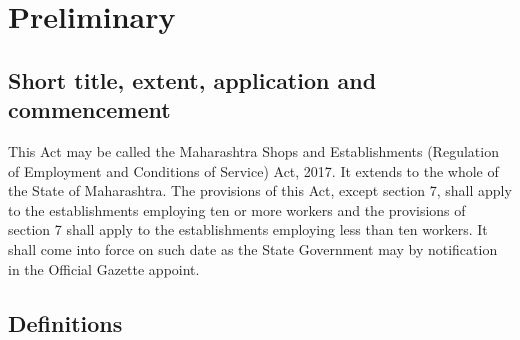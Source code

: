 \documentclass[gaz8,ordinance]{mhact}
\begin{document}
    



        \chapter{Preliminary} 
        
        \section{Short title, extent, application and commencement} 
        
      \begin{subsectionlist}
    
     This Act may be called the Maharashtra Shops and Establishments (Regulation of Employment and Conditions of Service) Act, 2017.
     It extends to the whole of the State of Maharashtra.
     The provisions of this Act, except section 7, shall apply to the 
establishments employing ten or more workers and the provisions of section 
7 shall apply to the establishments employing less than ten workers.
     It shall come into force on such date as the State Government may by 
notification in the Official Gazette appoint.
       \end{subsectionlist}
    
        \section{Definitions} 
        
\end{document}
